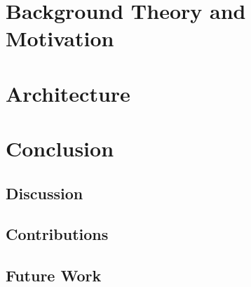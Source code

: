 \documentclass[a4paper, 11pt]{book}
\begin{document}
\chapter{Background Theory and Motivation}


\chapter{Architecture}



\chapter{Conclusion}
\section{Discussion}
\section{Contributions}
\section{Future Work}






\begin{appendices}
  
  
  
\end{appendices}
\end{document}
